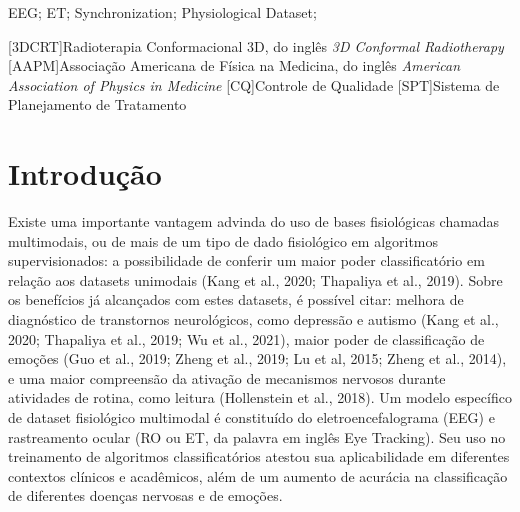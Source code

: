 \documentclass[a4paper, 12pt]{ppgeb}
\begin{document}
\vspace{14pt}

 EEG; ET; Synchronization; Physiological Dataset;
\acresetall %

\indice

\begin{center}

{\bfseries{} }%
\end{center}

[3DCRT]{Radioterapia Conformacional 3D, do inglês \emph{3D Conformal Radiotherapy}}
[AAPM]{Associação Americana de Física na Medicina, do inglês \emph{American Association of Physics in Medicine}}
[CQ]{Controle de Qualidade}
[SPT]{Sistema de Planejamento de Tratamento}

\begin{acronym}
\end{acronym}

\clearpage


\acresetall %

\chapter{Introdução}

Existe uma importante vantagem advinda do uso de bases fisiológicas chamadas multimodais, ou de mais de um tipo de dado fisiológico em algoritmos supervisionados: a possibilidade de conferir um maior poder classificatório em relação aos datasets unimodais (Kang et al., 2020; Thapaliya et al., 2019). Sobre os benefícios já alcançados com estes datasets, é possível citar: melhora de diagnóstico de transtornos neurológicos, como depressão e autismo (Kang et al., 2020; Thapaliya et al., 2019; Wu et al., 2021), maior poder de classificação de emoções (Guo et al., 2019; Zheng et al., 2019;  Lu et al, 2015; Zheng et al., 2014), e uma maior compreensão da ativação de mecanismos nervosos durante atividades de rotina, como leitura (Hollenstein et al., 2018). Um modelo específico de dataset fisiológico multimodal é constituído do eletroencefalograma (EEG) e rastreamento ocular (RO ou ET, da palavra em inglês Eye Tracking). Seu uso no treinamento de algoritmos classificatórios atestou sua aplicabilidade em diferentes contextos clínicos e acadêmicos, além de um aumento de acurácia na classificação de diferentes doenças nervosas e de emoções. 
\end{document}
